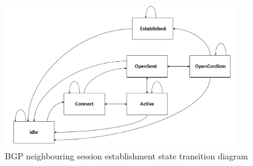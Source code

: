 \documentclass[a4paper]{article}
\begin{document}
\begin{figure}[H]
    \centering
    \includegraphics[width=0.9\textwidth]{figures/bgp-fsm.png}
    \caption{BGP neighbouring session establishment state transition diagram}
    \label{fig:BGP-FSM}
\end{figure}
\end{document}
